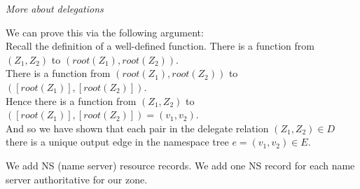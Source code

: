 \frmrule 

\textit{More about delegations}





We can prove this via the following argument:\\

Recall the definition of a well-defined function. 
There is a function from $(Z_1,Z_2)$ to $(root(Z_1),root(Z_2))$. \\
There is a function from $(root(Z_1),root(Z_2))$ to $([root(Z_1)],[root(Z_2)])$. \\
Hence there is a function from $(Z_1,Z_2)$ to $([root(Z_1)],[root(Z_2)]) = (v_1,v_2)$. \\
And so we have shown that each pair in the delegate relation $(Z_1,Z_2) \in D$ 
there is a unique output edge in the namespace tree $e = (v_1,v_2) \in E$. 


\frmrule 


We add NS (name server) resource records. 
We add one NS record for each name server authoritative for our zone.


